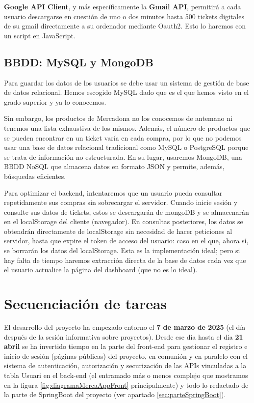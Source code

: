 \documentclass[a4paper,12pt]{report}
\begin{document}
			\textbf{Google API Client}, y más específicamente la \textbf{Gmail API}, permitirá a cada usuario descargarse en cuestión de uno o dos minutos hasta 500 tickets digitales de su gmail directamente a su ordenador mediante Oauth2. Esto lo haremos con un script en JavaScript.
			
		\subsection{BBDD: MySQL y MongoDB}
		
		
		Para guardar los datos de los usuarios se debe usar un sistema de gestión de base de datos relacional. Hemos escogido MySQL dado que es el que hemos visto en el grado superior y ya lo conocemos.
		
		Sin embargo, los productos de Mercadona no los conocemos de antemano ni tenemos una lista exhaustiva de los mismos. Además, el número de productos que se pueden encontrar en un ticket varía en cada compra, por lo que no podemos usar una base de datos relacional tradicional como MySQL o PostgreSQL porque se trata de información no estructurada. En su lugar, usaremos MongoDB, una BBDD NoSQL que almacena datos en formato JSON y permite, además, búsquedas eficientes.
		
		Para optimizar el backend, intentaremos que un usuario pueda consultar repetidamente sus compras sin sobrecargar el servidor. Cuando inicie sesión y consulte sus datos de tickets, estos se descargarán de mongoDB y se almacenarán en el localStorage del cliente (navegador). En consultas posteriores, los datos se obtendrán directamente de localStorage sin necesidad de hacer peticiones al servidor, hasta que expire el token de acceso del usuario: caso en el que, ahora sí, se borrarán los datos del localStorage. Esta es la implementación ideal; pero si hay falta de tiempo haremos extracción directa de la base de datos cada vez que el usuario actualice la página del dashboard (que no es lo ideal).
		



		
		\section{Secuenciación de tareas}
		
		El desarrollo del proyecto ha empezado entorno el \textbf{7 de marzo de 2025} (el día después de la sesión informativa sobre proyectos). Desde ese día hasta el día \textbf{21 abril} se ha invertido tiempo en la parte del front-end para gestionar el registro e inicio de sesión (páginas públicas) del proyecto, en comunión y en paralelo con el sistema de autenticación, autorización y securización de las APIs vinculadas a la tabla Usuari en el back-end (el entramado más o menos complejo que mostramos en la figura \ref{fig:diagramaMercaAppFront} principalmente) y todo lo redactado de la parte de SpringBoot del proyecto (ver apartado \ref{sec:parteSpringBoot}).
		
\end{document}
